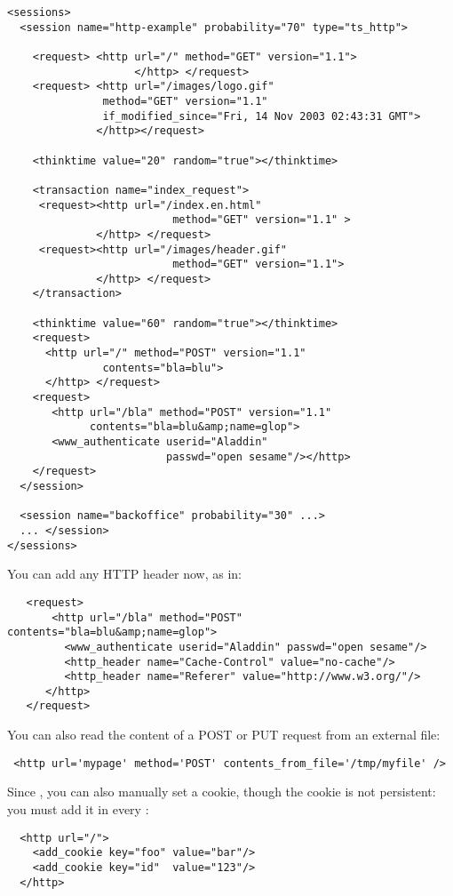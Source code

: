 \documentclass{TSUNG-en}
\begin{document}
\begin{Verbatim}
<sessions>
  <session name="http-example" probability="70" type="ts_http">

    <request> <http url="/" method="GET" version="1.1">
                    </http> </request>
    <request> <http url="/images/logo.gif"
               method="GET" version="1.1"
               if_modified_since="Fri, 14 Nov 2003 02:43:31 GMT">
              </http></request>

    <thinktime value="20" random="true"></thinktime>

    <transaction name="index_request">
     <request><http url="/index.en.html"
                          method="GET" version="1.1" >
              </http> </request>
     <request><http url="/images/header.gif"
                          method="GET" version="1.1">
              </http> </request>
    </transaction>

    <thinktime value="60" random="true"></thinktime>
    <request>
      <http url="/" method="POST" version="1.1"
               contents="bla=blu">
      </http> </request>
    <request>
       <http url="/bla" method="POST" version="1.1"
             contents="bla=blu&amp;name=glop">
       <www_authenticate userid="Aladdin"
                         passwd="open sesame"/></http>
    </request>
  </session>

  <session name="backoffice" probability="30" ...>
  ... </session>
</sessions>
\end{Verbatim}

 You can add any HTTP header now, as in:
\begin{Verbatim}
   <request>
       <http url="/bla" method="POST" contents="bla=blu&amp;name=glop">
         <www_authenticate userid="Aladdin" passwd="open sesame"/>
         <http_header name="Cache-Control" value="no-cache"/>
         <http_header name="Referer" value="http://www.w3.org/"/>
      </http>
   </request>
\end{Verbatim}

 You can also read the content of a POST or PUT
request from an external file:

\begin{Verbatim}
 <http url='mypage' method='POST' contents_from_file='/tmp/myfile' />
\end{Verbatim}

Since , you can also manually set a cookie, though the
cookie is not persistent: you must add it in every :
\begin{Verbatim}
  <http url="/">
    <add_cookie key="foo" value="bar"/>
    <add_cookie key="id"  value="123"/>
  </http>
\end{Verbatim}
\end{document}
